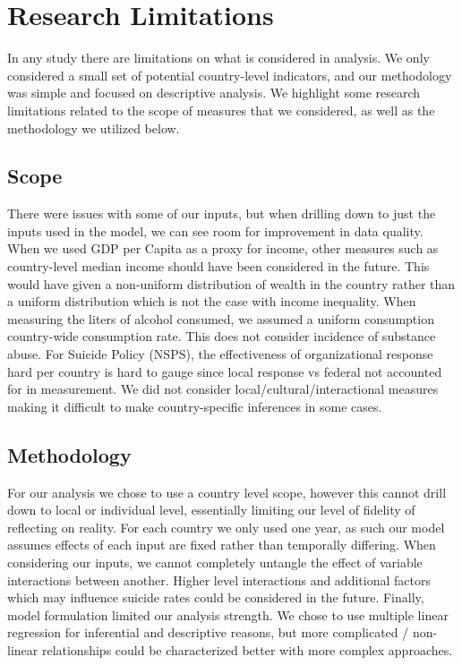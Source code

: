 \documentclass[]{article}
\begin{document}
\section{Research Limitations}\label{research-limitations}

In any study there are limitations on what is considered in analysis. We
only considered a small set of potential country-level indicators, and
our methodology was simple and focused on descriptive analysis. We
highlight some research limitations related to the scope of measures
that we considered, as well as the methodology we utilized below.

\subsection{Scope}\label{scope}

There were issues with some of our inputs, but when drilling down to
just the inputs used in the model, we can see room for improvement in
data quality. When we used GDP per Capita as a proxy for income, other
measures such as country-level median income should have been considered
in the future. This would have given a non-uniform distribution of
wealth in the country rather than a uniform distribution which is not
the case with income inequality. When measuring the liters of alcohol
consumed, we assumed a uniform consumption country-wide consumption
rate. This does not consider incidence of substance abuse. For Suicide
Policy (NSPS), the effectiveness of organizational response hard per
country is hard to gauge since local response vs federal not accounted
for in measurement. We did not consider local/cultural/interactional
measures making it difficult to make country-specific inferences in some
cases.

\subsection{Methodology}\label{methodology}

For our analysis we chose to use a country level scope, however this
cannot drill down to local or individual level, essentially limiting our
level of fidelity of reflecting on reality. For each country we only
used one year, as such our model assumes effects of each input are fixed
rather than temporally differing. When considering our inputs, we cannot
completely untangle the effect of variable interactions between another.
Higher level interactions and additional factors which may influence
suicide rates could be considered in the future. Finally, model
formulation limited our analysis strength. We chose to use multiple
linear regression for inferential and descriptive reasons, but more
complicated / non-linear relationships could be characterized better
with more complex approaches.
\end{document}
